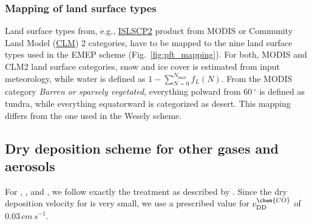 \documentclass[gmd, manuscript]{copernicus}
\begin{document}
\subsubsection*{Mapping of land surface types}
Land surface types from, e.g., \href{https://daac.ornl.gov/cgi-bin/dataset_lister.pl?p=29}{ISLSCP2} product from MODIS or Community Land Model (\href{http://www.cgd.ucar.edu/tss/clm/}{CLM}) 2 categories, have to be mapped to the nine land surface types used in the EMEP scheme (Fig.~\ref{fig:pft_mapping}). For both, MODIS and CLM2 land surface categories, snow and ice cover is estimated from input meteorology, while water is defined as $1-\sum_{N=0}^{N_\text{max}} f_L(N)$. From the MODIS category \emph{Barren or sparsely vegetated}, everything polward from $60\,\unit{^\circ}$ is defined as tundra, while everything equatorward is categorized as desert. This mapping differs from the one used in the Wesely scheme.

\subsection{Dry deposition scheme for other gases and aerosols}
For , , and , we follow exactly the treatment as described by \citet{ACP:Simpson2012}. Since the dry deposition velocity for  is very small, we use a prescribed value for $v_\text{DD}^\chem{CO}$ of $0.03\,\unit{cm\,s^{-1}}$.
\end{document}
